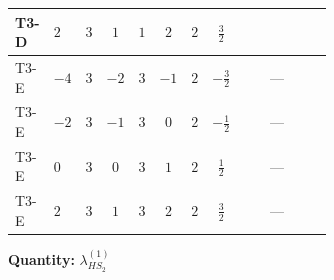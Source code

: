 \documentclass[8pt]{article}
\begin{document}
\begin{landscape}
\begin{longtable}{@{}llcccccc >{\raggedright\arraybackslash}p{0.21\linewidth} >{\raggedright\arraybackslash}p{0.21\linewidth} >{\raggedright\arraybackslash}p{0.21\linewidth}@{}}
T3-D & $2$ & $3$ & $1$ & $1$ & $2$ & $2$ & $\frac{3}{2}$ & \scriptsize\adjustbox{max width=\linewidth}{$\begin{gathered} -\frac{51 {g_1}^2 {\lambda_{HS_2}^{(1)}}}{2}\end{gathered}$} & \scriptsize\adjustbox{max width=\linewidth}{$\begin{gathered} +6 {\lambda_{12}^{(1)}} {\lambda_{HS_1}^{(1)}}\end{gathered}$} & \scriptsize\adjustbox{max width=\linewidth}{$\begin{gathered} +6 {\lambda_1} {\lambda_{HS_2}^{(1)}}\end{gathered}$} \\
\midrule
T3-E & $-4$ & $3$ & $-2$ & $3$ & $-1$ & $2$ & $-\frac{3}{2}$ & \scriptsize\adjustbox{max width=\linewidth}{$\begin{gathered} -\frac{15 {g_1}^2 {\lambda_{HS_2}^{(1)}}}{2}\end{gathered}$} & --- & \scriptsize\adjustbox{max width=\linewidth}{$\begin{gathered} +6 {\lambda_1} {\lambda_{HS_2}^{(1)}}\end{gathered}$} \\
\midrule
T3-E & $-2$ & $3$ & $-1$ & $3$ & $0$ & $2$ & $-\frac{1}{2}$ & \scriptsize\adjustbox{max width=\linewidth}{$\begin{gathered} -\frac{3 {g_1}^2 {\lambda_{HS_2}^{(1)}}}{2}\end{gathered}$} & --- & \scriptsize\adjustbox{max width=\linewidth}{$\begin{gathered} +6 {\lambda_1} {\lambda_{HS_2}^{(1)}}\end{gathered}$} \\
\midrule
T3-E & $0$ & $3$ & $0$ & $3$ & $1$ & $2$ & $\frac{1}{2}$ & \scriptsize\adjustbox{max width=\linewidth}{$\begin{gathered} -\frac{15 {g_1}^2 {\lambda_{HS_2}^{(1)}}}{2}\end{gathered}$} & --- & \scriptsize\adjustbox{max width=\linewidth}{$\begin{gathered} +6 {\lambda_1} {\lambda_{HS_2}^{(1)}}\end{gathered}$} \\
\midrule
T3-E & $2$ & $3$ & $1$ & $3$ & $2$ & $2$ & $\frac{3}{2}$ & \scriptsize\adjustbox{max width=\linewidth}{$\begin{gathered} -\frac{51 {g_1}^2 {\lambda_{HS_2}^{(1)}}}{2}\end{gathered}$} & --- & \scriptsize\adjustbox{max width=\linewidth}{$\begin{gathered} +6 {\lambda_1} {\lambda_{HS_2}^{(1)}}\end{gathered}$} \\
\midrule
\bottomrule
\end{longtable}
\clearpage
\noindent\textbf{Quantity: }$\lambda_{HS_2}^{(1)}$\par\smallskip

\end{landscape}
\end{document}

